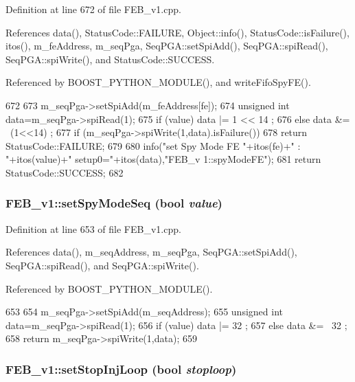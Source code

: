 Definition at line 672 of file FEB\_\-v1.cpp.

References data(), StatusCode::FAILURE, Object::info(), StatusCode::isFailure(), itos(), m\_\-feAddress, m\_\-seqPga, SeqPGA::setSpiAdd(), SeqPGA::spiRead(), SeqPGA::spiWrite(), and StatusCode::SUCCESS.

Referenced by BOOST\_\-PYTHON\_\-MODULE(), and writeFifoSpyFE().


\begin{DoxyCode}
672                                                    {
673   m_seqPga->setSpiAdd(m_feAddress[fe]);
674   unsigned int data=m_seqPga->spiRead(1);
675   if (value)  data |= 1 << 14  ;
676   else        data &= ~(1<<14) ;
677   if (m_seqPga->spiWrite(1,data).isFailure()){
678     return StatusCode::FAILURE;
679   }
680   info("set Spy Mode FE "+itos(fe)+" : "+itos(value)+" setup0="+itos(data),"FEB_v
      1::spyModeFE");
681   return StatusCode::SUCCESS;
682 }
\end{DoxyCode}
\hypertarget{classFEB__v1_a9e13da349fc335ec44032fa0426c40d0}{
\subsubsection[{setSpyModeSeq}]{ FEB\_\-v1::setSpyModeSeq (bool {\em value})}}
\label{classFEB__v1_a9e13da349fc335ec44032fa0426c40d0}


Definition at line 653 of file FEB\_\-v1.cpp.

References data(), m\_\-seqAddress, m\_\-seqPga, SeqPGA::setSpiAdd(), SeqPGA::spiRead(), and SeqPGA::spiWrite().

Referenced by BOOST\_\-PYTHON\_\-MODULE().


\begin{DoxyCode}
653                                             {
654   m_seqPga->setSpiAdd(m_seqAddress);
655   unsigned int data=m_seqPga->spiRead(1);
656   if (value)  data |= 32  ;
657   else        data &= ~32 ;
658   return m_seqPga->spiWrite(1,data);
659 }
\end{DoxyCode}
\hypertarget{classFEB__v1_aaf8386be3d27ea22e389b0a6c7699af7}{
\subsubsection[{setStopInjLoop}]{ FEB\_\-v1::setStopInjLoop (bool {\em stoploop})}}
\label{classFEB__v1_aaf8386be3d27ea22e389b0a6c7699af7}



